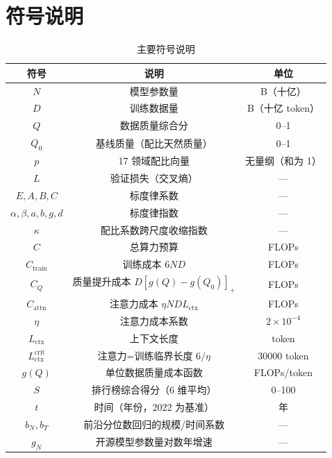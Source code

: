 \section{符号说明}

\begin{table}[htbp]
\centering
\caption{主要符号说明}
\begin{tabular}{c|c|c}
\toprule
\textbf{符号} & \textbf{说明} & \textbf{单位} \\
\midrule
$N$ & 模型参数量 & B（十亿） \\
$D$ & 训练数据量 & B（十亿 token） \\
$Q$ & 数据质量综合分 & 0--1 \\
$Q_0$ & 基线质量（配比天然质量） & 0--1 \\
$p$ & 17 领域配比向量 & 无量纲（和为 1） \\
$L$ & 验证损失（交叉熵） & --- \\
$E,A,B,C$ & 标度律系数 & --- \\
$\alpha,\beta,a,b,g,d$ & 标度律指数 & --- \\
$\kappa$ & 配比系数跨尺度收缩指数 & --- \\
$C$ & 总算力预算 & FLOPs \\
$C_{\text{train}}$ & 训练成本 $6ND$ & FLOPs \\
$C_Q$ & 质量提升成本 $D[g(Q)-g(Q_0)]_+$ & FLOPs \\
$C_{\text{attn}}$ & 注意力成本 $\eta N D L_{\text{ctx}}$ & FLOPs \\
$\eta$ & 注意力成本系数 & $2\times10^{-4}$ \\
$L_{\text{ctx}}$ & 上下文长度 & token \\
$L_{\text{ctx}}^{\text{crit}}$ & 注意力=训练临界长度 $6/\eta$ & 30000 token \\
$g(Q)$ & 单位数据质量成本函数 & FLOPs/token \\
$S$ & 排行榜综合得分（6 维平均） & 0--100 \\
$t$ & 时间（年份，2022 为基准） & 年 \\
$b_N,b_T$ & 前沿分位数回归的规模/时间系数 & --- \\
$g_N$ & 开源模型参数量对数年增速 & --- \\
\bottomrule
\end{tabular}
\end{table}
